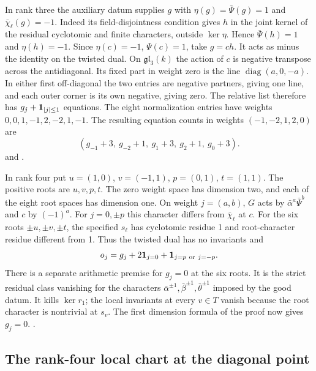 In rank three the auxiliary datum supplies \(g\) with
\(\eta(g)=\bar\Psi(g)=1\) and \(\bar\chi_\ell(g)=-1\).
Indeed its field-disjointness condition gives \(h\) in the joint
kernel of the residual cyclotomic and finite characters, outside
\(\ker\eta\). Hence \(\bar\Psi(h)=1\) and \(\eta(h)=-1\).
Since \(\eta(c)=-1\), \(\Psi(c)=1\), take \(g=ch\).
It acts as minus the identity on the twisted dual. On
\(\mathfrak {gl}_3(k)\) the action of \(c\) is negative transpose
across the antidiagonal. Its fixed part in weight zero is the line
\(\operatorname{diag}(a,0,-a)\). In either first off-diagonal the
two entries are negative partners, giving one line, and each outer
corner is its own negative, giving zero. The relative list therefore
has \(g_j+{\bf1}_{|j|\le1}\) equations. The eight normalization
entries have weights \(0,0,1,-1,2,-2,1,-1\). The resulting equation
counts in weights \((-1,-2,1,2,0)\) are
\[
 (g_{-1}+3,\ g_{-2}+1,\ g_1+3,\ g_2+1,\ g_0+3).
\]
and .

In rank four put \(u=(1,0)\), \(v=(-1,1)\), \(p=(0,1)\),
\(t=(1,1)\). The positive roots are \(u,v,p,t\). The zero
weight space has dimension two, and each of the eight root spaces has
dimension one. On weight \(j=(a,b)\), \(G\) acts by
\(\bar\alpha^a\bar\Psi^b\) and \(c\) by \((-1)^a\).
For \(j=0,\pm p\) this character differs from \(\bar\chi_\ell\)
at \(c\). For the six roots \(\pm u,\pm v,\pm t\), the specified
\(s_\ell\) has cyclotomic residue 1 and root-character residue
different from 1. Thus the twisted dual has no invariants and
\[
 o_j=g_j+2{\bf1}_{j=0}+{\bf1}_{j=p\ \mathrm{or}\ j=-p}.
\]
There is a separate arithmetic premise for \(g_j=0\) at the six
roots. It is the strict residual class vanishing for the characters
\(\bar\alpha^{\pm1},\bar\beta^{\pm1},\bar\theta^{\pm1}\) imposed by
the good datum. It kills \(\ker r_1\); the local invariants at every
\(v\in T\) vanish because the root character is nontrivial at \(s_v\).
The first dimension formula of the proof now gives \(g_j=0\).
.

\subsection{The rank-four local chart at the diagonal point}
\label{dp:chart}


